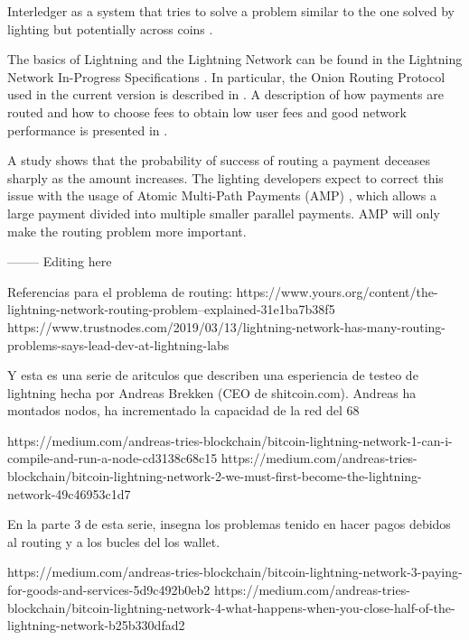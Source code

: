 Interledger as a system that tries to solve a problem similar to the one solved by lighting but potentially across coins \cite{Interledger}.

The basics of Lightning and the Lightning Network can be found in the Lightning Network In-Progress Specifications \cite{ln-spec}. In particular, the
Onion Routing Protocol used in the current version is described in \cite{BOLT_4_onion_routing}.
%
A description of how payments are routed and how to choose fees to obtain low user fees and good network performance is presented in \cite{dirouting}.

A study \cite{LightningStrikes} shows that the probability of success of routing a payment deceases sharply as the amount increases. 
The lighting developers expect to correct this issue with the usage of Atomic Multi-Path Payments (AMP) \cite{LightningStrikes,TNW}, which allows a large payment divided into multiple smaller parallel payments. AMP will only make the routing problem more important.


-------- Editing here

Referencias para el problema de routing: 
https://www.yours.org/content/the-lightning-network-routing-problem--explained-31e1ba7b38f5
https://www.trustnodes.com/2019/03/13/lightning-network-has-many-routing-problems-says-lead-dev-at-lightning-labs



Y esta es una serie de aritculos  que describen una esperiencia de testeo de lightning hecha por Andreas Brekken (CEO de shitcoin.com). 
Andreas ha montados nodos,  ha incrementado la capacidad de la red del 68%

https://medium.com/andreas-tries-blockchain/bitcoin-lightning-network-1-can-i-compile-and-run-a-node-cd3138c68c15
https://medium.com/andreas-tries-blockchain/bitcoin-lightning-network-2-we-must-first-become-the-lightning-network-49c46953c1d7

En la parte 3 de esta serie, insegna los problemas tenido en hacer pagos debidos al routing y a los bucles del los wallet.

https://medium.com/andreas-tries-blockchain/bitcoin-lightning-network-3-paying-for-goods-and-services-5d9c492b0eb2
https://medium.com/andreas-tries-blockchain/bitcoin-lightning-network-4-what-happens-when-you-close-half-of-the-lightning-network-b25b330dfad2